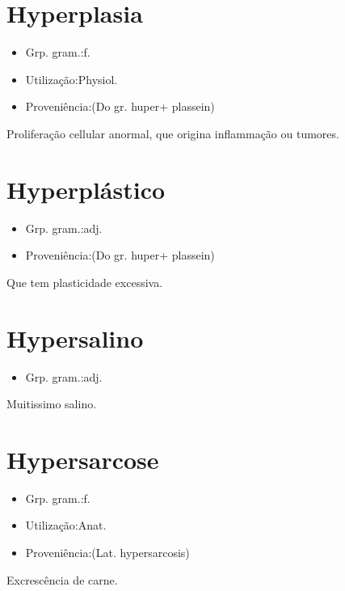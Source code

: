\documentclass{article}
\begin{document}
\section{Hyperplasia}
\begin{itemize}
\item {Grp. gram.:f.}
\end{itemize}
\begin{itemize}
\item {Utilização:Physiol.}
\end{itemize}
\begin{itemize}
\item {Proveniência:(Do gr. \textunderscore huper\textunderscore  + \textunderscore plassein\textunderscore )}
\end{itemize}
Proliferação cellular anormal, que origina inflammação ou tumores.
\section{Hyperplástico}
\begin{itemize}
\item {Grp. gram.:adj.}
\end{itemize}
\begin{itemize}
\item {Proveniência:(Do gr. \textunderscore huper\textunderscore  + \textunderscore plassein\textunderscore )}
\end{itemize}
Que tem plasticidade excessiva.
\section{Hypersalino}
\begin{itemize}
\item {Grp. gram.:adj.}
\end{itemize}
Muitissimo salino.
\section{Hypersarcose}
\begin{itemize}
\item {Grp. gram.:f.}
\end{itemize}
\begin{itemize}
\item {Utilização:Anat.}
\end{itemize}
\begin{itemize}
\item {Proveniência:(Lat. \textunderscore hypersarcosis\textunderscore )}
\end{itemize}
Excrescência de carne.
\end{document}
